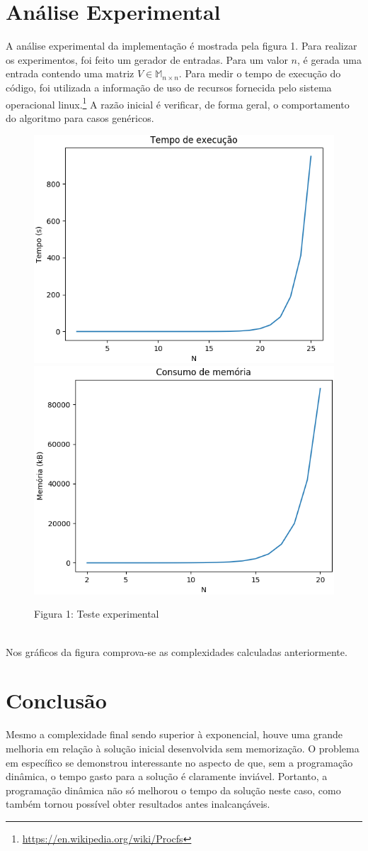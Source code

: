 \documentclass{article}
\begin{document}
\section{Análise Experimental}
A análise experimental da implementação é mostrada pela figura 1. Para realizar os experimentos, foi feito um gerador de entradas. Para um valor $n$, é gerada uma entrada contendo uma matriz $V \in \mathbb{M}_{n \times n}$. Para medir o tempo de execução do código, foi utilizada a informação de uso de recursos fornecida pelo sistema operacional linux.\footnote{\url{https://en.wikipedia.org/wiki/Procfs}} A razão inicial é verificar, de forma geral, o comportamento do algoritmo para casos genéricos.
\vspace{-10pt}
\begin{figure}[h]
  \centering
  \includegraphics[width=0.49\linewidth]{images/time.png}
  \includegraphics[width=0.49\linewidth]{images/space.png}
  \caption{Figura 1: Teste experimental}
\end{figure}\\
Nos gráficos da figura comprova-se as complexidades calculadas anteriormente.


\section{Conclusão}
Mesmo a complexidade final sendo superior à exponencial, houve uma grande melhoria em relação à solução inicial desenvolvida sem memorização. O problema em específico se demonstrou interessante no aspecto de que, sem a programação dinâmica, o tempo gasto para a solução é claramente inviável. Portanto, a programação dinâmica não só melhorou o tempo da solução neste caso, como também tornou possível obter resultados antes inalcançáveis.
\end{document}
